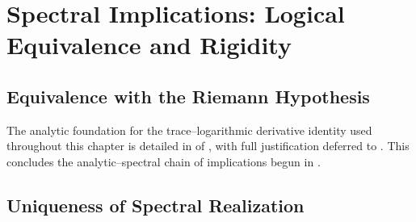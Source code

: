 \section{Spectral Implications: Logical Equivalence and Rigidity}
\label{sec:spectral_implications}




\subsection{Equivalence with the Riemann Hypothesis}
\label{sec:rh_equivalence}














\medskip

\noindent
The analytic foundation for the trace–logarithmic derivative identity used throughout this chapter is detailed in  of , with full justification deferred to . This concludes the analytic–spectral chain of implications begun in .

\subsection{Uniqueness of Spectral Realization}
\label{sec:uniqueness_spectral_realization}

